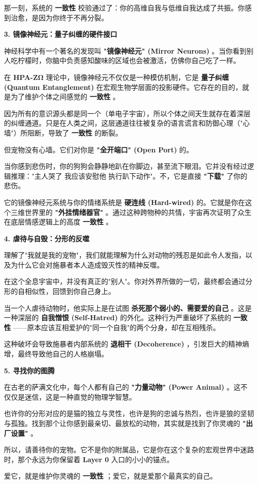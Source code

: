 那一刻，系统的 \textbf{一致性} 校验通过了：你的高维自我与低维自我达成了共振。你感到治愈，是因为你终于不再分裂。

\textbf{3. 镜像神经元：量子纠缠的硬件接口}

神经科学中有一个著名的发现叫 \textbf{"镜像神经元" (Mirror Neurons)} 。当你看到别人吃柠檬时，你脑中负责感知酸味的区域也会被激活，仿佛你自己吃了一样。

在 \textbf{HPA-ZΩ} 理论中，镜像神经元不仅仅是一种模仿机制，它是 \textbf{量子纠缠 (Quantum Entanglement)} 在宏观生物学层面的投影硬件。它存在的目的，就是为了维护个体之间感觉的 \textbf{一致性} 。

因为所有的意识源头都是同一个（单电子宇宙），所以个体之间天生就存在着深层的纠缠通道。只是在人类之间，这层通道往往被复杂的语言谎言和防御心理（"心墙"）所阻断，导致了 \textbf{一致性} 的断裂。

但宠物没有心墙。它们对你是 \textbf{"全开端口" (Open Port)} 的。

当你感到悲伤时，你的狗狗会静静地趴在你脚边，甚至流下眼泪。它并没有经过逻辑推理："主人哭了  我应该安慰他  执行趴下动作"。不，它是直接 \textbf{"下载"} 了你的悲伤。

它的镜像神经元系统与你的情绪系统是 \textbf{硬连线 (Hard-wired)} 的。它就是你在这个三维世界里的 \textbf{"外挂情绪器官"} 。通过这种跨物种的共情，宇宙再次证明了众生在底层情感逻辑上的高度 \textbf{一致性} 。

\textbf{4. 虐待与自毁：分形的反噬}

理解了"我就是我的宠物"，我们就能理解为什么对动物的残忍是如此令人发指，以及为什么它会对施暴者本人造成毁灭性的精神反噬。

在这个全息宇宙中，并没有真正的"别人"。你对外界所做的一切，最终都会通过分形的自相似性，回馈到你自己身上。

当一个人虐待动物时，他实际上是在试图 \textbf{杀死那个弱小的、需要爱的自己} 。这是一种深层的 \textbf{自我憎恨 (Self-Hatred)} 的外化。这种行为严重破坏了系统的 \textbf{一致性} ——原本应该互相爱护的"同一个自我"的两个分身，却在互相残杀。

这种破坏会导致施暴者内部系统的 \textbf{退相干 (Decoherence)} ，引发巨大的精神熵增，最终导致他自己的人格崩塌。

\textbf{5. 寻找你的图腾}

在古老的萨满文化中，每个人都有自己的 \textbf{"力量动物" (Power Animal)} 。这不仅仅是迷信，这是一种直觉的物理学智慧。

也许你的分形对应的是猫的独立与灵性，也许是狗的忠诚与热烈，也许是狼的坚韧与孤独。找到那个让你感到最亲切、最放松的动物，其实就是找到了你灵魂的 \textbf{"出厂设置"} 。

所以，请善待你的宠物。它不是你的附属品，它是你在这个复杂的宏观世界中迷路时，那个永远为你保留着 \textbf{Layer 0} 入口的小小的锚点。

爱它，就是维护你灵魂的 \textbf{一致性} ；爱它，就是爱那个最真实的自己。

